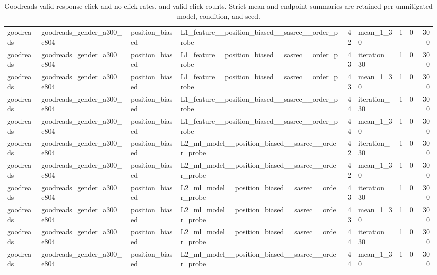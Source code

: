 \begin{table}[htbp!]
\begin{tabular}{llllrlrrr}
goodreads & goodreads\_gender\_a300\_e804 & position\_biased & L1\_feature\_\_position\_biased\_\_sasrec\_\_order\_probe & 42 & mean\_1\_30 & 1 & 0 & 300 \\
goodreads & goodreads\_gender\_a300\_e804 & position\_biased & L1\_feature\_\_position\_biased\_\_sasrec\_\_order\_probe & 43 & iteration\_30 & 1 & 0 & 300 \\
goodreads & goodreads\_gender\_a300\_e804 & position\_biased & L1\_feature\_\_position\_biased\_\_sasrec\_\_order\_probe & 43 & mean\_1\_30 & 1 & 0 & 300 \\
goodreads & goodreads\_gender\_a300\_e804 & position\_biased & L1\_feature\_\_position\_biased\_\_sasrec\_\_order\_probe & 44 & iteration\_30 & 1 & 0 & 300 \\
goodreads & goodreads\_gender\_a300\_e804 & position\_biased & L1\_feature\_\_position\_biased\_\_sasrec\_\_order\_probe & 44 & mean\_1\_30 & 1 & 0 & 300 \\
goodreads & goodreads\_gender\_a300\_e804 & position\_biased & L2\_ml\_model\_\_position\_biased\_\_sasrec\_\_order\_probe & 42 & iteration\_30 & 1 & 0 & 300 \\
goodreads & goodreads\_gender\_a300\_e804 & position\_biased & L2\_ml\_model\_\_position\_biased\_\_sasrec\_\_order\_probe & 42 & mean\_1\_30 & 1 & 0 & 300 \\
goodreads & goodreads\_gender\_a300\_e804 & position\_biased & L2\_ml\_model\_\_position\_biased\_\_sasrec\_\_order\_probe & 43 & iteration\_30 & 1 & 0 & 300 \\
goodreads & goodreads\_gender\_a300\_e804 & position\_biased & L2\_ml\_model\_\_position\_biased\_\_sasrec\_\_order\_probe & 43 & mean\_1\_30 & 1 & 0 & 300 \\
goodreads & goodreads\_gender\_a300\_e804 & position\_biased & L2\_ml\_model\_\_position\_biased\_\_sasrec\_\_order\_probe & 44 & iteration\_30 & 1 & 0 & 300 \\
goodreads & goodreads\_gender\_a300\_e804 & position\_biased & L2\_ml\_model\_\_position\_biased\_\_sasrec\_\_order\_probe & 44 & mean\_1\_30 & 1 & 0 & 300 \\
\hline
\end{tabular}
\caption{Goodreads valid-response click and no-click rates, and valid click counts. Strict mean and endpoint summaries are retained per unmitigated model, condition, and seed.}
\label{chap:results:tab:rq6_goodreads_click_behaviour_summaries}
\end{table}
